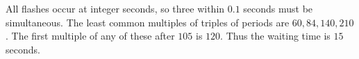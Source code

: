 All flashes occur at integer seconds, so three within $0.1$ seconds must be simultaneous. The least common multiples of triples of periods are $60,84,140,210$. The first multiple of any of these after $105$ is $120$. Thus the waiting time is $\boxed{15}$ seconds.
